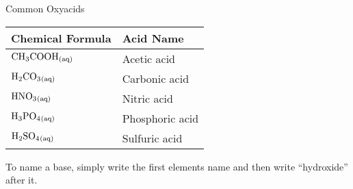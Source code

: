 \documentclass[12pt]{report}
\begin{document}
\begin{table}[h!] %

    \renewcommand{\arraystretch}{1.5} %
    \setlength{\tabcolsep}{10pt} %
    \setlength{\arrayrulewidth}{0.25mm}

    \begin{center}
        Common Oxyacids \\
        \vspace{0.5em}
        \begin{tabular}{|l|l|} %
        \hline
        Chemical Formula & Acid Name \\ %
        \hline
        $\ce{CH3COOH_{(aq)}}$ & Acetic acid \\ %
        \hline
        $\ce{H2CO3_{(aq)}}$ & Carbonic acid\\
        \hline 
        $\ce{HNO3_{(aq)}}$ & Nitric acid\\ 
        \hline 
        $\ce{H3PO4_{(aq)}}$ & Phosphoric acid\\ 
        \hline 
        $\ce{H2SO4_{(aq)}}$ & Sulfuric acid\\ 
        \hline
        \end{tabular}
    \end{center}
\end{table}

\newpage
To name a base, simply write the first elements name and then write ``hydroxide'' after it.
\end{document}
